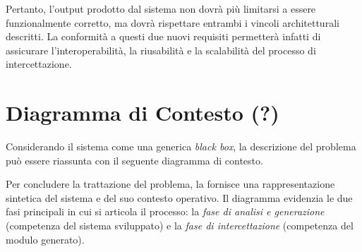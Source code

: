 Pertanto, l'output prodotto dal sistema non dovrà più limitarsi a essere funzionalmente corretto, ma dovrà rispettare entrambi i vincoli architetturali descritti. La conformità a questi due nuovi requisiti permetterà infatti di assicurare l'interoperabilità, la riusabilità e la scalabilità del processo di intercettazione.


\section{Diagramma di Contesto (?)} %

Considerando il sistema come una generica \textit{black box}, la descrizione del problema può essere riassunta con il seguente diagramma di contesto.

Per concludere la trattazione del problema, la  fornisce una rappresentazione sintetica del sistema e del suo contesto operativo. Il diagramma evidenzia le due fasi principali in cui si articola il processo: la \textit{fase di analisi e generazione} (competenza del sistema sviluppato) e la \textit{fase di intercettazione} (competenza del modulo generato).

